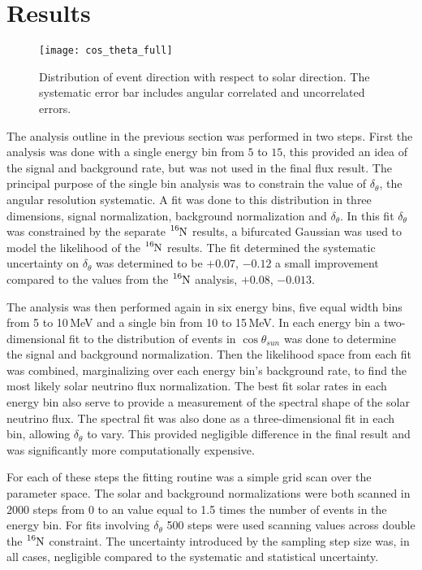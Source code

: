 \section{Results}
\begin{figure}
  \centering
  \texttt{[image: cos\_theta\_full]}
  \caption[5.0 to 15.0 MeV $\cos\theta_{sun}$ Distribution] {Distribution of event direction
                                              with respect to solar direction.
                                              The systematic error bar includes
                                              angular correlated and
                                              uncorrelated errors.}

  \label{fig:costheta}
\end{figure}
The analysis outline in the previous section was performed in two steps.
First the analysis was done with a single energy bin from $5$ to $15$,
this provided an idea of the signal and background rate, but was not used in
the final flux result.
The principal purpose of the single bin analysis was to constrain the value of
$\delta_{\theta}$, the angular resolution systematic.
A fit was done to this distribution in three dimensions, signal normalization,
background normalization and $\delta_{\theta}$.
In this fit $\delta_{\theta}$ was constrained by the separate $\ce{^{16}N}$ 
results, a bifurcated Gaussian was used to model the likelihood of the
$\ce{^{16}N}$ results.
The fit determined the systematic uncertainty on $\delta_{\theta}$
was determined to be $+0.07$, $-0.12$ a small improvement  compared to the values from the 
$\ce{^{16}N}$ analysis, $+0.08$, $-0.013$.

The analysis was then performed again in six energy bins, five equal width
bins from 5 to 10\,MeV and a single bin from 10 to 15\,MeV.
In each energy bin a two-dimensional fit to the distribution of events in $\cos\theta_{sun}$ was
done to determine the signal and background normalization.
Then the likelihood space from each fit was combined,
marginalizing over each energy bin's background rate,
to find the most likely solar neutrino flux normalization.
The best fit solar rates in each energy bin also serve to provide
a measurement of the spectral shape of the solar neutrino
flux.
The spectral fit was also done as a three-dimensional fit
in each bin, allowing $\delta_{\theta}$ to vary.
This provided negligible difference in the final result
and was significantly more computationally expensive.

For each of these steps the fitting routine was a simple grid scan
over the parameter space. 
The solar and background normalizations were both scanned in $2000$ steps from 0 to
an  value equal to  1.5 times the number of events in the energy bin.
For fits involving $\delta_{\theta}$ 500 steps were used scanning values across
double the $\ce{^{16}N}$ constraint.
The uncertainty introduced by the sampling step size was, in all cases, negligible
compared to the systematic and statistical uncertainty.

